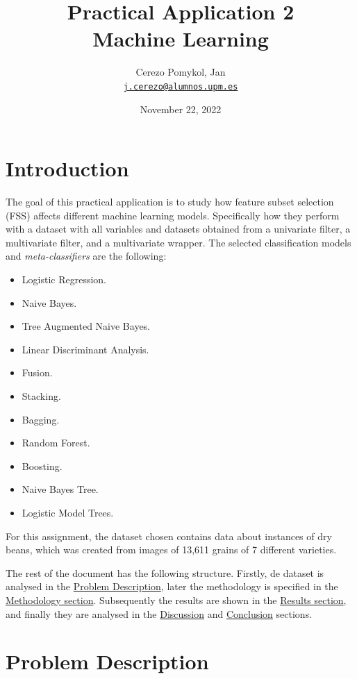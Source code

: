 \documentclass[a4paper,11pt]{article}
\author{
	\Large Cerezo Pomykol, Jan\\ \href{mailto:j.cerezo@alumnos.upm.es}{\small\texttt{j.cerezo@alumnos.upm.es}}
}
\title{\textbf{\Huge Practical Application 2} \\
		\Large Machine Learning}
\date{\Large November 22, 2022}
\begin{document}
\maketitle
\vfill

\tableofcontents
\newpage

\section{Introduction}
\label{sec:introduction}

The goal of this practical application is to study how feature subset selection (FSS) affects different machine learning models. Specifically how they perform with a dataset with all variables and datasets obtained from a univariate filter, a multivariate filter, and a multivariate wrapper. The selected classification models and \textit{meta-classifiers} are the following:

\begin{itemize}
\item Logistic Regression.
\item Naive Bayes.
\item Tree Augmented Naive Bayes.
\item Linear Discriminant Analysis.
\item Fusion.
\item Stacking.
\item Bagging.
\item Random Forest.
\item Boosting.
\item Naive Bayes Tree.
\item Logistic Model Trees.
\end{itemize}

For this assignment, the dataset chosen \cite{misc_dry_bean_dataset_602}\cite{KOKLU2020105507} contains data about instances of dry beans, which was created from images of 13,611 grains of 7 different varieties.

The rest of the document has the following structure. Firstly, de dataset is analysed in the \hyperref[sec:problem]{Problem Description}, later the methodology is specified in the \hyperref[sec:methodology]{Methodology section}. Subsequently the results are shown in the \hyperref[sec:results]{Results section}, and finally they are analysed in the \hyperref[sec:discussion]{Discussion} and \hyperref[sec:conclusion]{Conclusion} sections.

\section{Problem Description}
\label{sec:problem}
\end{document}
